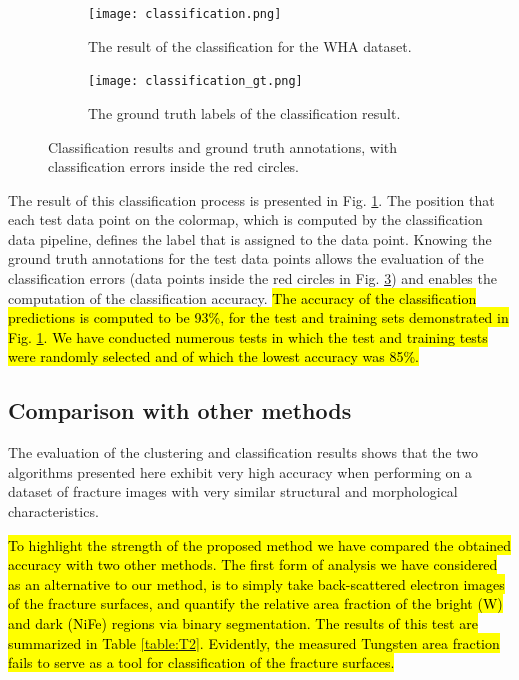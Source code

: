 \documentclass[authoryear,preprint,review,12pt, singleside]{elsarticle}
\begin{document}
\begin{figure}[!h]
	\centering
	\begin{subfigure}[b]{0.49\textwidth}
		\centering
		\texttt{[image: classification.png]}
		\caption{The result of the classification for the WHA dataset.}
		\label{fig:classification}
	\end{subfigure}
	\begin{subfigure}[b]{0.49\textwidth}
		\centering
		\texttt{[image: classification\_gt.png]}
		\caption{The ground truth labels of the classification result.}
		\label{fig:classification_gt}
	\end{subfigure}
	\caption{Classification results and ground truth annotations, with classification errors inside the red circles.}
\end{figure}



The result of this classification process is presented in Fig. \ref{fig:classification}. The position that each test data point on the colormap, which is computed by the classification data pipeline, defines the label that is assigned to the data point. Knowing the ground truth annotations for the test data points allows the evaluation of the classification errors (data points inside the red circles in Fig. \ref{fig:classification_gt}) and enables the computation of the classification accuracy. \hl{The accuracy of the classification predictions is computed to be 93\%, for the test and training sets demonstrated in Fig. {\ref{fig:classification}}. We have conducted numerous tests in which the test and training tests were randomly selected and of which the lowest accuracy was 85\%.} 


\subsection{Comparison with other methods}

The evaluation of the clustering and classification results shows that the two algorithms presented here exhibit very high accuracy when performing on a dataset of fracture images with very similar structural and morphological characteristics. 

\hl{To highlight the strength of the proposed method we have compared the obtained accuracy with two other methods. The first form of analysis we have considered as an alternative to our method, is to simply take back-scattered electron images of the fracture surfaces, and quantify the relative area fraction of the bright (W) and dark (NiFe) regions via binary segmentation. The results of this test are summarized in Table {\ref{table:T2}}. Evidently, the measured Tungsten area fraction fails to serve as a tool for classification of the fracture surfaces. }
\end{document}
